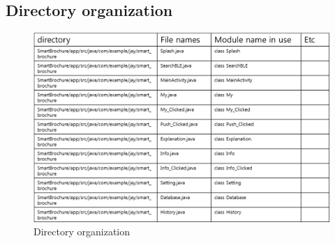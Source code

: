 \documentclass[conference]{IEEEtran}
\begin{document}
\subsection{Directory organization}
\begin{figure}[htbp]
\begin{center}
    \includegraphics[scale=0.5]{img_direc}
    \caption{Directory organization} 
\end{center}
\end{figure}
\quad
 \\\\\\\\\\\\\\\\\\\\\\\\\\\\\\\\\\\\\\\\\\\\\\\\\\\\\\\\\\\\\\\\\\\\\\\\\\\\\\\\\\\\\\\\\\\\\\\\\
\end{document}
